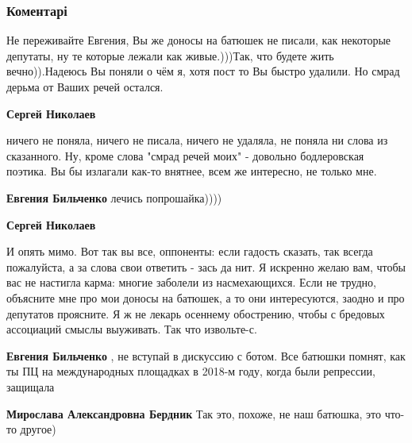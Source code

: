  
 
 
 
 
\subsubsection{Коментарі}
\label{sec:20_10_2021.fb.bilchenko_evgenia.4.prosjba_pomosch.cmt}

\begin{itemize} %

Не переживайте Евгения, Вы же доносы на батюшек не писали, как некоторые
депутаты, ну те которые лежали как живые.)))Так, что будете жить вечно)).Надеюсь
Вы поняли о чём я, хотя пост то Вы быстро удалили. Но смрад дерьма от Ваших речей
остался.

\begin{itemize} %
\textbf{Сергей Николаев} 

ничего не поняла, ничего не писала, ничего не удаляла, не поняла ни слова из
сказанного. Ну, кроме слова "смрад речей моих" - довольно бодлеровская поэтика.
Вы бы излагали как-то внятнее, всем же интересно, не только мне.

\textbf{Евгения Бильченко} лечись попрошайка))))

\textbf{Сергей Николаев} 

И опять мимо. Вот так вы все, оппоненты: если гадость сказать, так всегда
пожалуйста, а за слова свои ответить - зась да нит. Я искренно желаю вам, чтобы
вас не настигла карма: многие заболели из насмехающихся. Если не трудно,
объясните мне про мои доносы на батюшек, а то они интересуются, заодно и про
депутатов проясните. Я ж не лекарь осеннему обострению, чтобы с бредовых
ассоциаций смыслы выуживать. Так что извольте-с.


\textbf{Евгения Бильченко} , не вступай в дискуссию с ботом. Все батюшки помнят, как ты ПЦ на международных площадках в 2018-м году, когда были репрессии, защищала

\textbf{Мирослава Александровна Бердник} Так это, похоже, не наш батюшка, это что-то другое)
\end{itemize} %


\end{itemize}

